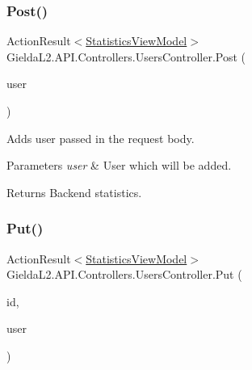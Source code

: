 \subsubsection{\texorpdfstring{Post()}{Post()}}
{\footnotesize\ttfamily Action\+Result$<$\mbox{\hyperlink{class_gielda_l2_1_1_a_p_i_1_1_view_models_1_1_view_1_1_statistics_view_model}{Statistics\+View\+Model}}$>$ Gielda\+L2.\+A\+P\+I.\+Controllers.\+Users\+Controller.\+Post (\begin{DoxyParamCaption}\item[{\mbox{[}\+From\+Body\mbox{]} \mbox{\hyperlink{class_gielda_l2_1_1_a_p_i_1_1_view_models_1_1_edit_1_1_edit_user_view_model}{Edit\+User\+View\+Model}}}]{user }\end{DoxyParamCaption})}



Adds user passed in the request body. 


\begin{DoxyParams}{Parameters}
{\em user} & User which will be added.\\
\hline
\end{DoxyParams}
\begin{DoxyReturn}{Returns}
Backend statistics.
\end{DoxyReturn}
\mbox{\label{class_gielda_l2_1_1_a_p_i_1_1_controllers_1_1_users_controller_abe00d21f9abb32cb07ada5815bec4e0a}} 
\subsubsection{\texorpdfstring{Put()}{Put()}}
{\footnotesize\ttfamily Action\+Result$<$\mbox{\hyperlink{class_gielda_l2_1_1_a_p_i_1_1_view_models_1_1_view_1_1_statistics_view_model}{Statistics\+View\+Model}}$>$ Gielda\+L2.\+A\+P\+I.\+Controllers.\+Users\+Controller.\+Put (\begin{DoxyParamCaption}\item[{int}]{id,  }\item[{\mbox{[}\+From\+Body\mbox{]} \mbox{\hyperlink{class_gielda_l2_1_1_a_p_i_1_1_view_models_1_1_edit_1_1_edit_user_view_model}{Edit\+User\+View\+Model}}}]{user }\end{DoxyParamCaption})}



